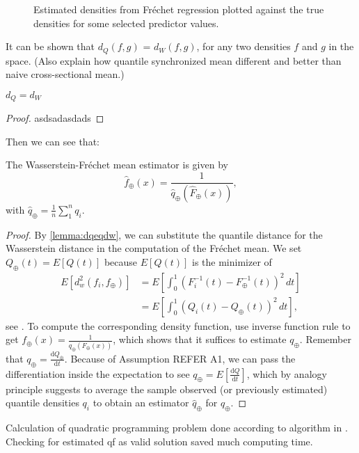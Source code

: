 \begin{figure}[h]
    \centering
    \resizebox{1\textwidth}{!}{}
    \caption[Comparison: estimated vs. true densities --- Fréchet]{Estimated
    densities from Fréchet regression plotted against the true densities for some selected
    predictor values.}
    \label{fig:frechet_est_vs_true}
\end{figure}

It can be shown that $d_Q(f,g)$ = $d_W(f,g)$, for any two densities $f$ and $g$ in the
space. (Also explain how quantile synchronized mean different and better than naive
cross-sectional mean.)
\begin{lemma}
    \label{lemma:dqeqdw}
    $d_Q = d_W$
\end{lemma}
\begin{proof}
    asdsadasdads
\end{proof}

Then we can see that:
\begin{lemma}
    The Wasserstein-Fréchet mean estimator is given by
    \begin{equation}
        \hat{f}_\oplus(x) = \frac{1}{\hat{q}_\oplus(\hat{F}_\oplus(x))},
    \end{equation}
    with $\hat{q}_\oplus = \frac{1}{n} \sum_{1}^{n} q_i$.
\end{lemma}
\begin{proof}
    By \ref{lemma:dqeqdw}, we can substitute the quantile distance for the
    Wasserstein distance in the computation of the Fréchet mean. We set
    $Q_\oplus(t) = E[Q(t)]$ because $E[Q(t)]$ is the minimizer of
    \begin{equation}
    \label{eq:wf_mean}
        \begin{aligned}
            E[d_w^2(f_i, f_\oplus)]	& =
            E\left[\int_{0}^{1}(F_i^{-1}(t) - F_\oplus^{-1}(t))^2 \,dt\right] \\
                                    & =
            E\left[\int_{0}^{1}(Q_i(t) - Q_\oplus(t))^2 \,dt\right],
        \end{aligned}
    \end{equation}
    see \citet[Chapter~3.1.4]{PanaretosZemel2020}. To compute the corresponding density
    function, use inverse function rule to get
    $f_\oplus(x) = \frac{1}{q_\oplus(F_\oplus(x))}$, which shows that it suffices to
    estimate $q_\oplus$. Remember that
    $q_\oplus = \frac{\mathrm{d}Q_\oplus}{\mathrm{d}t}$. Because of Assumption REFER A1,
    we can pass the differentiation inside the expectation to see
    $q_\oplus = E\left[\frac{\mathrm{d}Q}{\mathrm{d}t}\right]$, which by analogy
    principle suggests to average the sample observed (or previously estimated)
    quantile densities $q_i$ to obtain an estimator $\hat{q}_\oplus$ for $q_\oplus$.
\end{proof}


Calculation of quadratic programming problem done according to algorithm in \textcite{PetersenLiuDivani2021}.
Checking for estimated qf as valid solution saved much computing time.